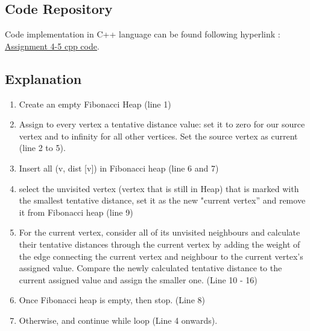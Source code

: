 \documentclass{article}
\begin{document}
\subsection{Code Repository}
Code implementation in C++ language can be found following hyperlink :  \href{https://github.com/mohit83k/iiti_ms_assignments/blob/main/advancedalgo/4-5/dijkstra.cpp}{Assignment 4-5 cpp code}.
\subsection{Explanation}
\begin{enumerate}
\item Create an empty Fibonacci Heap (line 1)
\item	Assign to every vertex a tentative distance value: set it to zero for our source vertex and to infinity for all other vertices. Set the source vertex as current (line 2 to 5).
\item	Insert all (v, dist [v]) in Fibonacci heap (line 6 and 7)
\item	select the unvisited vertex (vertex that is still in Heap) that is marked with the smallest tentative distance, set it as the new "current vertex” and remove it from Fibonacci heap (line 9)
\item	For the current vertex, consider all of its unvisited neighbours and calculate their tentative distances through the current vertex by adding the weight of the edge connecting the current vertex and neighbour to the current vertex's assigned value. Compare the newly calculated tentative distance to the current assigned value and assign the smaller one. (Line 10 - 16)
\item	Once Fibonacci heap is empty, then stop. (Line 8)
\item	Otherwise, and continue while loop (Line 4 onwards). 

\end{enumerate}
\end{document}
